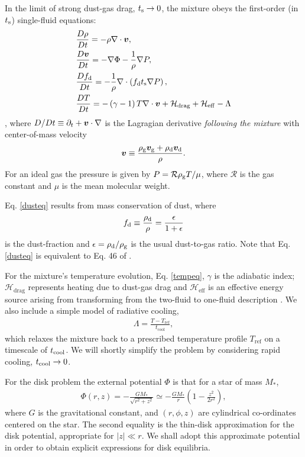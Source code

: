 In the limit of strong dust-gas drag, $t_\mathrm{s}\to0$, the mixture obeys 
the first-order (in $t_\mathrm{s}$) single-fluid equations: 
\begin{align} 
  &\frac{D\rho}{Dt} = -\rho\nabla\cdot\bm{v}, \label{masseq}\\ 
  &\frac{D\bm{v}}{Dt} = - \nabla\Phi - \frac{1}{\rho}\nabla  P, \label{momeq}\\ 
  &\frac{Df_\mathrm{d}}{Dt} = -\frac{1}{\rho} \nabla \cdot \left(f_\mathrm{d} 
  t_\mathrm{s} \nabla P \right),\label{dusteq}\\
  &\frac{D T}{D t} = - \left(\gamma-1\right)T\nabla\cdot\bm{v} +
  \mathcal{H}_\mathrm{drag} + \mathcal{H}_\mathrm{eff}  - \Lambda  \label{tempeq} 
\end{align}
\citep{laibe14}, where $D/Dt \equiv \partial_t + \bm{v}\cdot\nabla$ is the Lagragian
derivative \emph{following the mixture} with center-of-mass velocity  
\begin{align}
  \bm{v} \equiv \frac{\rho_\mathrm{g}\bm{v}_\mathrm{g} + 
    \rho_\mathrm{d}\bm{v}_\mathrm{d}}{\rho}. 
\end{align}
For an ideal gas the pressure is given
by $P = \mathcal{R}\rho_\mathrm{g} T/\mu $, where $\mathcal{R}$ is
the gas constant and $\mu$ is the mean molecular weight. 

Eq. \ref{dusteq} results from mass conservation of dust, where 
\begin{align}
  f_\mathrm{d} \equiv \frac{\rho_\mathrm{d}}{\rho}  = \frac{\epsilon}{1+\epsilon} 
\end{align}
is the dust-fraction and $\epsilon=\rho_\mathrm{d}/\rho_\mathrm{g}$ is the usual
dust-to-gas ratio. Note that Eq. \ref{dusteq} is 
equivalent to Eq. 46 of \cite{jacquet11}. 

For the mixture's temperature evolution, Eq. \ref{tempeq}, $\gamma$ is
the adiabatic index; $\mathcal{H}_\mathrm{drag}$ represents heating
due to dust-gas drag and $\mathcal{H}_\mathrm{eff}$ is an effective
energy source arising from transforming from the two-fluid to
one-fluid description \citep[see][ for details]{laibe14}. We also
include a simple model of radiative cooling,
\begin{align}
  \Lambda = \frac{T -
    T_\mathrm{ref}}{t_\mathrm{cool}}, \label{realenergy} 
\end{align}
which relaxes the mixture back to a prescribed temperature profile   
$T_\mathrm{ref}$ on a timescale of $t_\mathrm{cool}$. We will shortly simplify
the problem by considering rapid cooling, $t_\mathrm{cool}\to0$. 


For the disk problem the external potential $\Phi$ is  
that for a star of mass $M_*$, 
\begin{align}\label{thin_disk_potential}
  \Phi(r,z) =-\frac{GM_*}{\sqrt{r^2 + z^2}}\simeq
  -\frac{GM_*}{r}\left(1 - \frac{z^2}{2r^2}\right), 
\end{align}
where $G$ is the gravitational constant, and $(r,\phi, z)$ are
cylindrical co-ordinates centered on the star. 
The second equality is the 
thin-disk approximation for the disk potential, appropriate for
$|z|\ll r$. We shall adopt this approximate potential in order to
obtain explicit expressions for disk equilibria.  

